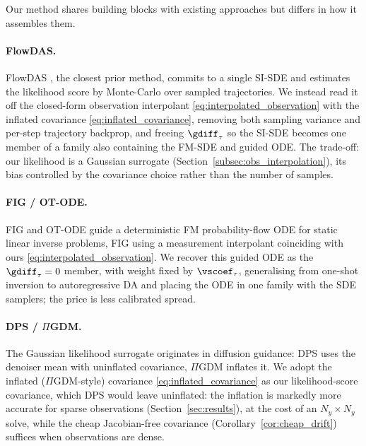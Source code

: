 
Our method shares building blocks with existing approaches but differs in how it assembles them.

\paragraph{FlowDAS.}
FlowDAS \cite{chen_flowdas_2025}, the closest prior method, commits to a single SI-SDE and estimates the likelihood score by Monte-Carlo over sampled trajectories. We instead read it off the closed-form observation interpolant \eqref{eq:interpolated_observation} with the inflated covariance \eqref{eq:inflated_covariance}, removing both sampling variance and per-step trajectory backprop, and freeing $\gdiff_\tau$ so the SI-SDE becomes one member of a family also containing the FM-SDE and guided ODE. The trade-off: our likelihood is a Gaussian surrogate (Section~\ref{subsec:obs_interpolation}), its bias controlled by the covariance choice rather than the number of samples.

\paragraph{FIG / OT-ODE.}
FIG \cite{yan_fig_2024} and OT-ODE \cite{pokle_training-free_2024} guide a deterministic FM probability-flow ODE for static linear inverse problems, FIG using a measurement interpolant coinciding with ours \eqref{eq:interpolated_observation}. We recover this guided ODE as the $\gdiff_\tau=0$ member, with weight fixed by $\vscoef_\tau$, generalising from one-shot inversion to autoregressive DA and placing the ODE in one family with the SDE samplers; the price is less calibrated spread.

\paragraph{DPS / $\Pi$GDM.}
The Gaussian likelihood surrogate originates in diffusion guidance: DPS \cite{chung_diffusion_2023} uses the denoiser mean with uninflated covariance, $\Pi$GDM \cite{song_pseudoinverse_2023} inflates it. We adopt the inflated ($\Pi$GDM-style) covariance \eqref{eq:inflated_covariance} as our likelihood-score covariance, which DPS would leave uninflated: the inflation is markedly more accurate for sparse observations (Section~\ref{sec:results}), at the cost of an $N_y\times N_y$ solve, while the cheap Jacobian-free covariance (Corollary~\ref{cor:cheap_drift}) suffices when observations are dense.


